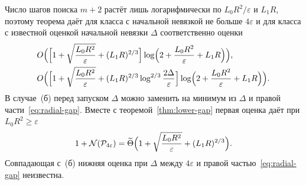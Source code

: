 Число шагов поиска $m+2$ растёт лишь логарифмически по $L_0R^2/\varepsilon$ и $L_1R$, поэтому теорема даёт для класса с начальной невязкой не больше $4\varepsilon$ и для класса с известной оценкой начальной невязки $\Delta$ соответственно оценки
\begin{align*}
 &O\Bigl(\Bigl[1+\sqrt{\frac{L_0R^2}\varepsilon}+(L_1R)^{2/3}\Bigr]\log\Bigl(2+\frac{L_0R^2}\varepsilon+L_1R\Bigr)\Bigr),\\
 &O\Bigl(\Bigl[1+\sqrt{\frac{L_0R^2}\varepsilon}+(L_1R)^{2/3}\log^{2/3}\frac{2\Delta}\varepsilon\Bigr]\log\Bigl(2+\frac{L_0R^2}\varepsilon+L_1R\Bigr)\Bigr).
\end{align*}
В случае~(б) перед запуском $\Delta$ можно заменить на минимум из $\Delta$ и правой части~\eqref{eq:radial-gap}. Вместе с теоремой~\ref{thm:lower-gap} первая оценка даёт при $L_0R^2\ge\varepsilon$
\[
 1+\mathcal N(\mathcal P_{4\varepsilon})=\widetilde\Theta\Bigl(1+\sqrt{\frac{L_0R^2}\varepsilon}+(L_1R)^{2/3}\Bigr).
\]
Совпадающая с~(б) нижняя оценка при $\Delta$ между $4\varepsilon$ и правой частью~\eqref{eq:radial-gap} неизвестна.
